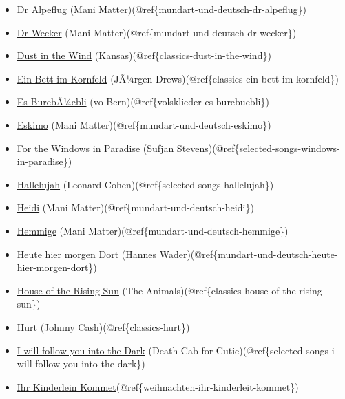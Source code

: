 \documentclass[
]{article}
\begin{document}
\begin{itemize}
{  Bergli} (vo Bern)(@ref\{mundart-und-deutsch-det-ane-am-bergli\})
\item
  \protect\hyperlink{mundart-und-deutsch-dr-alpeflug}{Dr Alpeflug} (Mani
  Matter)(@ref\{mundart-und-deutsch-dr-alpeflug\})
\item
  \protect\hyperlink{mundart-und-deutsch-dr-wecker}{Dr Wecker} (Mani
  Matter)(@ref\{mundart-und-deutsch-dr-wecker\})
\item
  \protect\hyperlink{classics-dust-in-the-wind}{Dust in the Wind}
  (Kansas)(@ref\{classics-dust-in-the-wind\})
\item
  \protect\hyperlink{classics-ein-bett-im-kornfeld}{Ein Bett im
  Kornfeld} (JÃ¼rgen Drews)(@ref\{classics-ein-bett-im-kornfeld\})
\item
  \protect\hyperlink{volsklieder-es-burebuebli}{Es BurebÃ¼ebli} (vo
  Bern)(@ref\{volsklieder-es-burebuebli\})
\item
  \protect\hyperlink{mundart-und-deutsch-eskimo}{Eskimo} (Mani
  Matter)(@ref\{mundart-und-deutsch-eskimo\})
\item
  \protect\hyperlink{selected-songs-windows-in-paradise}{For the Windows
  in Paradise} (Sufjan
  Stevens)(@ref\{selected-songs-windows-in-paradise\})
\item
  \protect\hyperlink{selected-songs-hallelujah}{Hallelujah} (Leonard
  Cohen)(@ref\{selected-songs-hallelujah\})
\item
  \protect\hyperlink{mundart-und-deutsch-heidi}{Heidi} (Mani
  Matter)(@ref\{mundart-und-deutsch-heidi\})
\item
  \protect\hyperlink{mundart-und-deutsch-hemmige}{Hemmige} (Mani
  Matter)(@ref\{mundart-und-deutsch-hemmige\})
\item
  \protect\hyperlink{mundart-und-deutsch-heute-hier-morgen-dort}{Heute
  hier morgen Dort} (Hannes
  Wader)(@ref\{mundart-und-deutsch-heute-hier-morgen-dort\})
\item
  \protect\hyperlink{classics-house-of-the-rising-sun}{House of the
  Rising Sun} (The Animals)(@ref\{classics-house-of-the-rising-sun\})
\item
  \protect\hyperlink{classics-hurt}{Hurt} (Johnny
  Cash)(@ref\{classics-hurt\})
\item
  \protect\hyperlink{selected-songs-i-will-follow-you-into-the-dark}{I
  will follow you into the Dark} (Death Cab for
  Cutie)(@ref\{selected-songs-i-will-follow-you-into-the-dark\})
\item
  \protect\hyperlink{weihnachten-ihr-kinderleit-kommet}{Ihr Kinderlein
  Kommet}(@ref\{weihnachten-ihr-kinderleit-kommet\})

\end{itemize}
\end{document}
